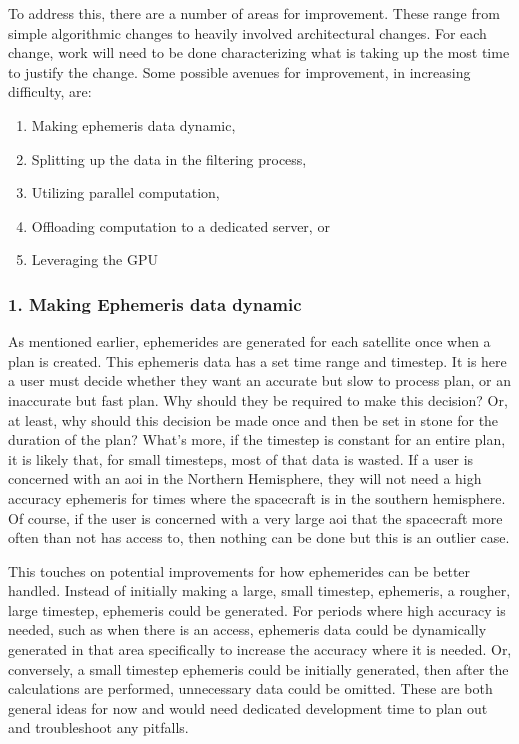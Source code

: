 To address this, there are a number of areas for improvement.  These range from
simple algorithmic changes to heavily involved architectural changes. For each
change, work will need to be done characterizing what is taking up the most
time to justify the change. Some possible avenues for improvement, in increasing
difficulty, are:

\begin{enumerate}
    \item Making ephemeris data dynamic,
    \item Splitting up the data in the filtering process,
    \item Utilizing parallel computation,
    \item Offloading computation to a dedicated server, or
    \item Leveraging the GPU
\end{enumerate}


\subsubsection{1. Making Ephemeris data dynamic}

As mentioned earlier, ephemerides are generated for each satellite once when a
plan is created. This ephemeris data has a set time range and timestep. It is
here a user must decide whether they want an accurate but slow to process plan,
or an inaccurate but fast plan. Why should they be required to make this
decision? Or, at least, why should this decision be made once and then be set
in stone for the duration of the plan? What's more, if the timestep is constant
for an entire plan, it is likely that, for small timesteps, most of that data
is wasted. If a user is concerned with an \gls{aoi} in the Northern Hemisphere,
they will not need a high accuracy ephemeris for times where the spacecraft is
in the southern hemisphere. Of course, if the user is concerned with a very
large \gls{aoi} that the spacecraft more often than not has access to, then
nothing can be done but this is an outlier case.

This touches on potential improvements for how ephemerides can be better
handled.  Instead of initially making a large, small timestep, ephemeris, a
rougher, large timestep, ephemeris could be generated. For periods where high
accuracy is needed, such as when there is an access, ephemeris data could be
dynamically generated in that area specifically to increase the accuracy where
it is needed. Or, conversely, a small timestep ephemeris could be initially
generated, then after the calculations are performed, unnecessary data could be
omitted. These are both general ideas for now and would need dedicated
development time to plan out and troubleshoot any pitfalls.


